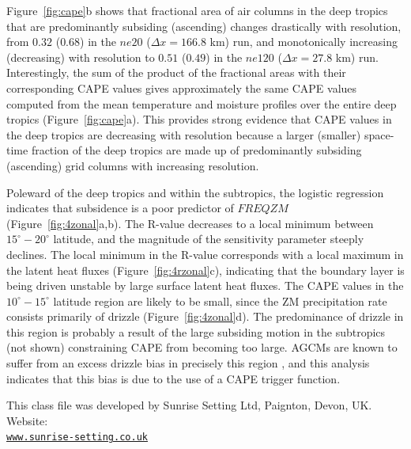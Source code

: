 \documentclass[times]{qjrms4}
\begin{document}
Figure~\ref{fig:cape}b shows that fractional area of air columns in the deep tropics that are predominantly subsiding (ascending) changes drastically with resolution, from $0.32$ ($0.68$) in the $ne20$ ($\Delta x = 166.8$ km) run, and monotonically increasing (decreasing) with resolution to $0.51$ ($0.49$) in the $ne120$ ($\Delta x = 27.8$ km) run. Interestingly, the sum of the product of the fractional areas with their corresponding CAPE values gives approximately the same CAPE values computed from the mean temperature and moisture profiles over the entire deep tropics (Figure~\ref{fig:cape}a). This provides strong evidence that CAPE values in the deep tropics are decreasing with resolution because a larger (smaller) space-time fraction of the deep tropics are made up of predominantly subsiding (ascending) grid columns with increasing resolution.

Poleward of the deep tropics and within the subtropics, the logistic regression indicates that subsidence is a poor predictor of $FREQZM$ (Figure~\ref{fig:4zonal}a,b). The R-value decreases to a local minimum between $15^{\circ} - 20^{\circ}$ latitude, and the magnitude of the sensitivity parameter steeply declines. The local minimum in the R-value corresponds with a local maximum in the latent heat fluxes (Figure~\ref{fig:4rzonal}c), indicating that the boundary layer is being driven unstable by large surface latent heat fluxes. The CAPE values in the $10^{\circ} - 15^{\circ}$ latitude region are likely to be small, since the ZM precipitation rate consists primarily of drizzle (Figure~\ref{fig:4zonal}d). The predominance of drizzle in this region is probably a result of the large subsiding motion in the subtropics (not shown) constraining CAPE from becoming too large. AGCMs are known to suffer from an excess drizzle bias in precisely this region \citep{D2006JCLIM}, and this analysis indicates that this bias is due to the use of a CAPE trigger function.

\ack This class file was developed by Sunrise Setting Ltd,
Paignton, Devon, UK. Website:\\
\href{http://www.sunrise-setting.co.uk}{\texttt{www.sunrise-setting.co.uk}}



\end{document}
